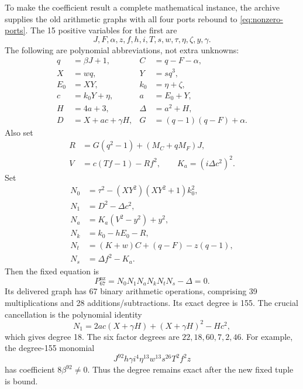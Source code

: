 To make the coefficient result a complete mathematical instance, the
archive supplies the old arithmetic graphs with all four ports rebound
to \eqref{eq:nonzero-ports}.  The 15 positive variables for the first are
\[
 J,F,\alpha,z,f,h,i,T,s,w,\tau,\eta,\zeta,y,\gamma.
\]
The following are polynomial abbreviations, not extra unknowns:
\begin{align*}
 q&=\beta J+1,& C&=q-F-\alpha,\\
 X&=wq,& Y&=sq^3,\\
 E_0&=XY,& k_0&=\eta+\zeta,\\
 c&=k_0Y+\eta,& a&=E_0+Y,\\
 H&=4a+3,& \Delta&=a^2+H,\\
 D&=X+ac+\gamma H,& G&=(q-1)(q-F)+\alpha.
\end{align*}
Also set
\begin{align*}
 R&=G(q^2-1)+(M_C+qM_F)J,\\
 V&=c(Tf-1)-Rf^2,\qquad K_a=(i\Delta c^2)^2.
\end{align*}
Set
\begin{align*}
 N_0&=\tau^2-(XY^2)(XY^2+1)k_0^2,\\
 N_1&=D^2-\Delta c^2,\\
 N_a&=K_a(V^2-y^2)+y^2,\\
 N_k&=k_0-hE_0-R,\\
 N_t&=(K+w)C+(q-F)-z(q-1),\\
 N_s&=\Delta f^2-K_a.
\end{align*}
Then the fixed equation is
\begin{equation}
 \boxed{P_{67}^{\mathrm{nz}}=N_0N_1N_aN_kN_tN_s-\Delta=0.}
 \label{eq:nonzero-p67}
\end{equation}
Its delivered graph has 67 binary arithmetic operations, comprising
39 multiplications and 28 additions/subtractions.  Its exact degree is
155.  The crucial cancellation is the polynomial identity
\[
 N_1=2ac(X+\gamma H)+(X+\gamma H)^2-Hc^2,
\]
which gives degree 18.  The six factor degrees are
$22,18,60,7,2,46$.  For example, the degree-155 monomial
\[
 J^{92}h\gamma i^4\eta^{13}w^{13}s^{26}T^2f^2z
\]
has coefficient $8\beta^{92}\ne0$.  Thus the degree remains exact after
the new fixed tuple is bound.

